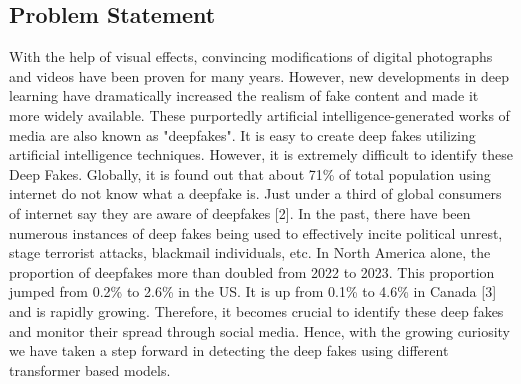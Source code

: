 \subsection{Problem Statement}
With the help of visual effects, convincing modifications of digital photographs and videos have been proven for many years. However, new developments in deep learning have dramatically increased the realism of fake content and made it more widely available. These purportedly artificial intelligence-generated works of media are also known as "deepfakes". It is easy to create deep fakes utilizing artificial intelligence techniques. However, it is extremely difficult to identify these Deep Fakes.
Globally, it is found out that about 71\% of total population using internet do not know what a deepfake is. Just under a third of global consumers of internet say they are aware of deepfakes [2]. In the past, there have been numerous instances of deep fakes being used to effectively incite political unrest, stage terrorist attacks, blackmail individuals, etc.
In North America alone, the proportion of deepfakes more than doubled from 2022 to 2023. This proportion jumped from 0.2\% to 2.6\% in the US. It is up from 0.1\% to 4.6\% in Canada [3] and is rapidly growing. Therefore, it becomes crucial to identify these deep fakes and monitor their spread through social media. Hence, with the growing curiosity we have taken a step forward in detecting the deep fakes using different transformer based models.